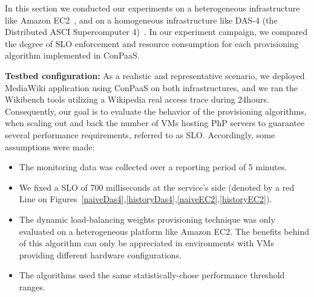 In this section we conducted our experiments on a heterogeneous infrastructure like Amazon EC2~\cite{amazonEC2}, and on a homogeneous infrastructure like DAS-4 (the Distributed ASCI Supercomputer 4)~\cite{das4}. In our experiment campaign, we compared the degree of SLO enforcement and resource consumption for each provisioning algorithm implemented in ConPaaS. 


\textbf{Testbed configuration:}  As a realistic and representative scenario, we deployed MediaWiki application using 	ConPaaS on both infrastructures, and we ran the Wikibench tools utilizing a Wikipedia real access trace during 24hours. Consequently, our goal is to evaluate the behavior of the provisioning algorithms, when scaling out and back the number of VMs hosting PhP servers to guarantee several performance requirements, referred to as SLO.  Accordingly, some assumptions were made:

\begin{itemize}

\item The monitoring data was collected over a reporting period of 5 minutes.

\item We fixed a SLO of 700 milliseconds at the service's side (denoted by a red Line on Figures~\ref{naiveDas4},\ref{historyDas4},\ref{naiveEC2},\ref{historyEC2}).


\item The dynamic load-balancing weights provisioning technique was only evaluated on a heterogeneous platform like Amazon EC2. The benefits behind of this algorithm can only be appreciated in environments with VMs providing different hardware configurations. 

\item The algorithms used the same statistically-chose performance threshold ranges. 

\end{itemize}



